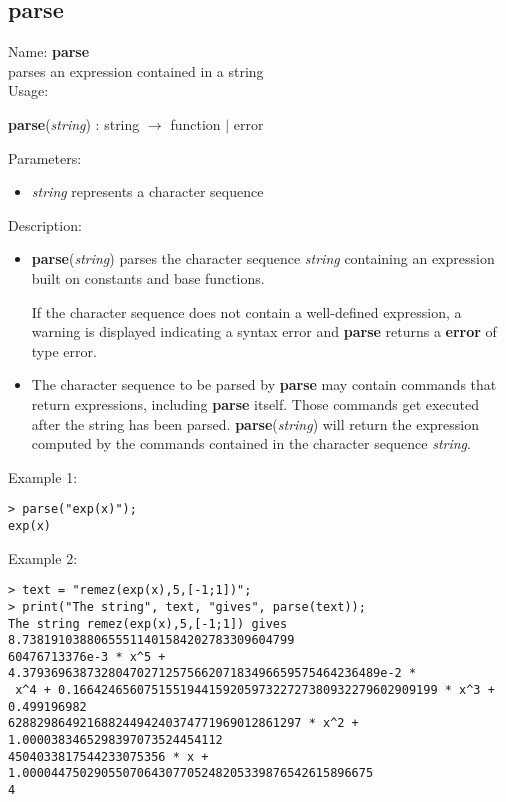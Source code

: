 \subsection{parse}
\label{labparse}
\noindent Name: \textbf{parse}\\
parses an expression contained in a string\\
\noindent Usage: 
\begin{center}
\textbf{parse}(\emph{string}) : \textsf{string} $\rightarrow$ \textsf{function} $|$ \textsf{error}\\
\end{center}
Parameters: 
\begin{itemize}
\item \emph{string} represents a character sequence
\end{itemize}
\noindent Description: \begin{itemize}

\item \textbf{parse}(\emph{string}) parses the character sequence \emph{string} containing
   an expression built on constants and base functions.
    
   If the character sequence does not contain a well-defined expression,
   a warning is displayed indicating a syntax error and \textbf{parse} returns
   a \textbf{error} of type \textsf{error}.

\item The character sequence to be parsed by \textbf{parse} may contain commands that 
   return expressions, including \textbf{parse} itself. Those commands get executed after the string has been parsed.
   \textbf{parse}(\emph{string}) will return the expression computed by the commands contained in the character 
   sequence \emph{string}.
\end{itemize}
\noindent Example 1: 
\begin{center}\begin{minipage}{15cm}\begin{Verbatim}[frame=single]
> parse("exp(x)");
exp(x)
\end{Verbatim}
\end{minipage}\end{center}
\noindent Example 2: 
\begin{center}\begin{minipage}{15cm}\begin{Verbatim}[frame=single]
> text = "remez(exp(x),5,[-1;1])";
> print("The string", text, "gives", parse(text));
The string remez(exp(x),5,[-1;1]) gives 8.73819103880655511401584202783309604799
60476713376e-3 * x^5 + 4.37936963873280470271257566207183496659575464236489e-2 *
 x^4 + 0.166424656075155194415920597322727380932279602909199 * x^3 + 0.499196982
62882986492168824494240374771969012861297 * x^2 + 1.0000383465298397073524454112
4504033817544233075356 * x + 1.0000447502905507064307705248205339876542615896675
4
\end{Verbatim}
\end{minipage}\end{center}
